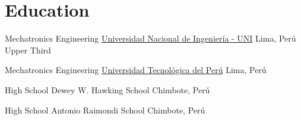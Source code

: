 \section{Education}

{Mechatronics Engineering}
{\href{http://en.wikipedia.org/wiki/National_University_of_Engineering}{Universidad Nacional de Ingeniería - UNI}}
{Lima, Perú}{}
{Upper Third} 

{Mechatronics Engineering}
{\href{http://www.utp.edu.pe/}{Universidad Tecnológica del Perú}}
{Lima, Perú}{}
{}

{High School}
{Dewey W. Hawking School}
{Chimbote, Perú}{}
{}

{High School}
{Antonio Raimondi School}
{Chimbote, Perú}{}
{}
